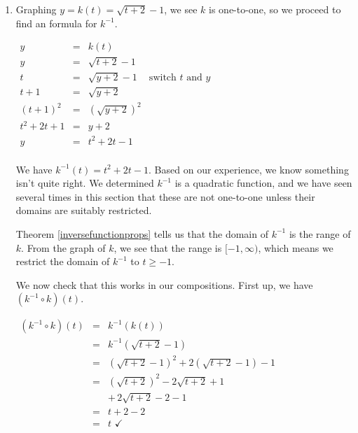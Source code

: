 \documentclass{ximera}
\begin{document}
\begin{example}
\begin{explanation}
\begin{enumerate}
\item  Graphing $y=k(t) =\sqrt{t+2} - 1$, we see  $k$ is one-to-one, so we proceed to find an formula for $k^{-1}$.

\begin{center}

$\begin{array}{rclr}

y & = & k(t) & \\

y & = & \sqrt{t+2}-1 & \\

t & = & \sqrt{y+2} - 1 & \text{switch $t$ and $y$} \\

t+1 & = & \sqrt{y+2} & \\

(t+1)^2 & = & \left(\sqrt{y+2}\right)^2 & \\

t^2 + 2t + 1 & = & y + 2 & \\

y & = & t^2 + 2t - 1 & \\

\end{array}$

\end{center}


We have $k^{-1}(t) = t^2+2t-1$.  Based on our experience, we know something isn't quite right.  We determined $k^{-1}$ is a quadratic function, and we have seen several times in this section that these are not one-to-one unless their domains are suitably restricted.  

Theorem \ref{inversefunctionprops} tells us that the domain of $k^{-1}$ is the range of $k$.  From the graph of $k$, we see that the range is $[-1, \infty)$, which means we restrict the domain of $k^{-1}$ to $t \geq -1$. 

We now check that this works in our compositions.  First up, we have $\left(k^{-1} \circ k \right)(t)$. 

\begin{center}

$ \begin{array}{rcl}
\left(k^{-1} \circ k \right)(t) & = & k^{-1}(k(t))  \\ 
& = & k^{-1}\left(\sqrt{t+2}-1\right)  \\
& = & \left(\sqrt{t+2}-1\right)^2 + 2\left(\sqrt{t+2}-1\right) - 1 \\
& = & \left(\sqrt{t+2}\right)^2 - 2\sqrt{t+2} + 1 \\
&& + \, 2 \sqrt{t+2} - 2 - 1  \\
& = &t+2 -2   \\
& = & t \, \, \checkmark \\
\end{array}$
\end{center}



\end{enumerate}
\end{explanation}
\end{example}
\end{document}
